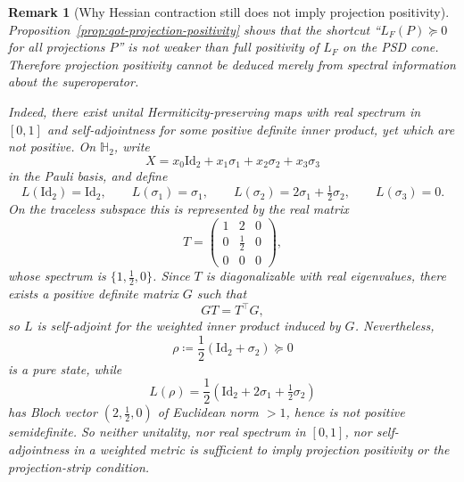 \documentclass[11pt]{article}
\newcommand{\Id}{\mathrm{Id}}
\newcommand{\eqdef}{\coloneqq}
\newcommand{\Hh}{\mathbb{H}}
\theoremstyle{plain}
\newtheorem{remark}{Remark}[section]
\begin{document}
\begin{remark}[Why Hessian contraction still does not imply projection positivity]
\label{rem:qot-weighted-spectrum-not-enough}
Proposition~\ref{prop:qot-projection-positivity} shows that the shortcut
``$L_F(P)\succeq 0$ for all projections $P$'' is \emph{not} weaker than full positivity of $L_F$ on the PSD cone.
Therefore projection positivity cannot be deduced merely from spectral information about the superoperator.

Indeed, there exist unital Hermiticity-preserving maps with real spectrum in $[0,1]$ and self-adjointness for some positive definite inner product, yet which are not positive.
On $\Hh_2$, write
\[
X=x_0 \Id_2 + x_1 \sigma_1 + x_2 \sigma_2 + x_3 \sigma_3
\]
in the Pauli basis, and define
\[
L(\Id_2)=\Id_2,\qquad
L(\sigma_1)=\sigma_1,\qquad
L(\sigma_2)=2\sigma_1+\tfrac12\sigma_2,\qquad
L(\sigma_3)=0.
\]
On the traceless subspace this is represented by the real matrix
\[
T=
\begin{pmatrix}
1 & 2 & 0\\
0 & \tfrac12 & 0\\
0 & 0 & 0
\end{pmatrix},
\]
whose spectrum is $\{1,\tfrac12,0\}$.
Since $T$ is diagonalizable with real eigenvalues, there exists a positive definite matrix $G$ such that
\[
GT=T^\top G,
\]
so $L$ is self-adjoint for the weighted inner product induced by $G$.
Nevertheless,
\[
\rho \eqdef \frac12(\Id_2+\sigma_2)\succeq 0
\]
is a pure state, while
\[
L(\rho)=\frac12(\Id_2+2\sigma_1+\tfrac12\sigma_2)
\]
has Bloch vector $(2,\tfrac12,0)$ of Euclidean norm $>\!1$, hence is not positive semidefinite.
So neither unitality, nor real spectrum in $[0,1]$, nor self-adjointness in a weighted metric is sufficient to imply projection positivity or the projection-strip condition.
\end{remark}
\end{document}
